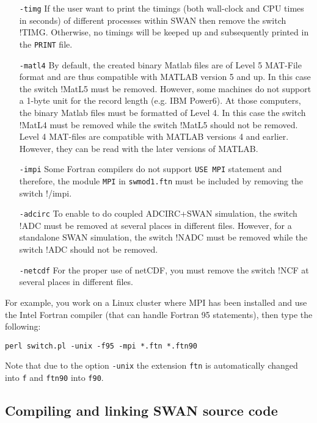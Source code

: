 \documentclass[12pt]{book}
\begin{document}
\begin{itemize}
  \item[{\tt -timg}]
  If the user want to print the timings (both wall-clock and CPU times in seconds) of different
  processes within SWAN then remove the switch !TIMG. Otherwise, no timings will be keeped up
  and subsequently printed in the {\tt PRINT} file.
  \item[{\tt -matl4}]
  By default, the created binary Matlab files are of Level 5 MAT-File format and are thus
  compatible with MATLAB version 5 and up. In this case the switch !MatL5 must be removed.
  However, some machines do not support a 1-byte unit for the record length (e.g. IBM Power6).
  At those computers, the binary Matlab files must be formatted of Level 4. In this case the
  switch !MatL4 must be removed while the switch !MatL5 should not be removed. Level 4 MAT-files
  are compatible with MATLAB versions 4 and earlier. However, they can be read with the later
  versions of MATLAB.
  \item[{\tt -impi}]
  Some Fortran compilers do not support {\tt USE MPI} statement and therefore,
  the module {\tt MPI} in {\tt swmod1.ftn} must be included by removing the switch !/impi.
  \item[{\tt -adcirc}]
  To enable to do coupled ADCIRC+SWAN simulation, the switch !ADC must be removed at several places
  in different files. However, for a standalone SWAN simulation, the switch !NADC must be
  removed while the switch !ADC should not be removed.
  \item[{\tt -netcdf}]
  For the proper use of netCDF, you must remove the switch !NCF at several places in different files.
\end{itemize}

\noindent
For example, you work on a Linux cluster where MPI has been installed and use the Intel Fortran
compiler (that can handle Fortran 95 statements), then type the following:
\begin{verbatim}
perl switch.pl -unix -f95 -mpi *.ftn *.ftn90
\end{verbatim}
Note that due to the option {\tt -unix} the extension {\tt ftn} is automatically changed into {\tt f}
and {\tt ftn90} into {\tt f90}.

\subsection{Compiling and linking SWAN source code}
\end{document}
